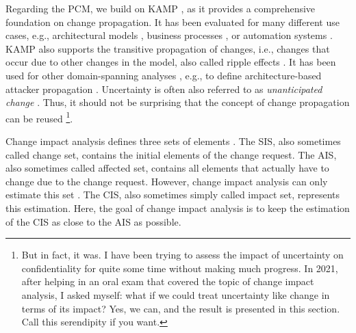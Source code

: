 Regarding the \ac{PCM}, we build on \acf{KAMP} \cite{heinrich_methodology_2018,rostami_architecture-based_2015,rostami_architecture-based_2017,heinrich_architecture-based_2018,busch_architecture-based_2020}, as it provides a comprehensive foundation on change propagation.
It has been evaluated for many different use cases, e.g., architectural models \cite{rostami_architecture-based_2015}, business processes \cite{rostami_architecture-based_2017}, or automation systems \cite{heinrich_architecture-based_2018}.
\ac{KAMP} also supports the transitive propagation of changes, i.e., changes that occur due to other changes in the model, also called ripple effects \cite{bohner_software_2002}.
It has been used for other domain-spanning analyses \cite{heinrich_methodology_2018}, e.g., to define architecture-based attacker propagation \cite{walter_architectural_2022-1,walter_architecture-based_2023-1,walter_context-based_2023}.
Uncertainty is often also referred to as \emph{unanticipated change} \cite{hezavehi_uncertainty_2021,weyns_introduction_2020}.
Thus, it should not be surprising that the concept of change propagation can be reused%
\footnote{But in fact, it was. I have been trying to assess the impact of uncertainty on confidentiality for quite some time without making much progress. In 2021, after helping in an oral exam that covered the topic of change impact analysis, I asked myself: what if we could treat uncertainty like change in terms of its impact? Yes, we can, and the result is presented in this section. Call this serendipity if you want.}.


Change impact analysis defines three sets of elements \cite{busch_architecture-based_2020,bohner_software_2002}.
The \acf{SIS}, also sometimes called change set, contains the initial elements of the change request.
The \acf{AIS}, also sometimes called affected set, contains all elements that actually have to change due to the change request.
However, change impact analysis can only estimate this set \cite{busch_architecture-based_2020}.
The \acf{CIS}, also sometimes simply called impact set, represents this estimation.
Here, the goal of change impact analysis is to keep the estimation of the \ac{CIS} as close to the \ac{AIS} as possible.




